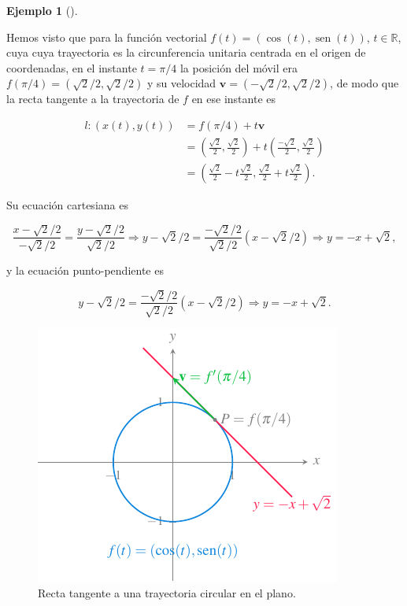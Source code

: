 \documentclass[
  a4paper,
]{scrreport}
\theoremstyle{definition}
\newtheorem{example}{Ejemplo}[chapter]
\theoremstyle{plain}
\theoremstyle{plain}
\theoremstyle{plain}
\theoremstyle{definition}
\theoremstyle{remark}
\begin{document}
\begin{example}[]\protect\hypertarget{exm-tangente-trayectoria-plano}{}\label{exm-tangente-trayectoria-plano}

Hemos visto que para la función vectorial
\(f(t) = (\cos(t),\operatorname{sen}(t))\), \(t\in \mathbb{R}\), cuya
cuya trayectoria es la circunferencia unitaria centrada en el origen de
coordenadas, en el instante \(t=\pi/4\) la posición del móvil era
\(f(\pi/4)=(\sqrt{2}/2,\sqrt{2}/2)\) y su velocidad
\(\mathbf{v}=(-\sqrt{2}/2,\sqrt{2}/2)\), de modo que la recta tangente a
la trayectoria de \(f\) en ese instante es

\begin{align*}
l: (x(t),y(t)) 
&= f(\pi/4)+t\mathbf{v} \\
&= \left(\frac{\sqrt{2}}{2},\frac{\sqrt{2}}{2}\right)+t\left(\frac{-\sqrt{2}}{2},\frac{\sqrt{2}}{2}\right) \\
&= \left(\frac{\sqrt{2}}{2}-t\frac{\sqrt{2}}{2},\frac{\sqrt{2}}{2}+t\frac{\sqrt{2}}{2}\right).
\end{align*}

Su ecuación cartesiana es

\[
\frac{x-\sqrt{2}/2}{-\sqrt{2}/2} = \frac{y-\sqrt{2}/2}{\sqrt{2}/2}\Rightarrow y-\sqrt{2}/2 =
\frac{-\sqrt{2}/2}{\sqrt{2}/2}(x-\sqrt{2}/2) \Rightarrow y=-x+\sqrt{2},
\]

y la ecuación punto-pendiente es

\[
y-\sqrt{2}/2 = \frac{-\sqrt{2}/2}{\sqrt{2}/2}(x-\sqrt{2}/2) \Rightarrow y=-x+\sqrt{2}.
\]

\begin{figure}

{\centering \includegraphics{img/derivadas-funciones-vectoriales/tangente-trayectoria-plano.pdf}

}

\caption{Recta tangente a una trayectoria circular en el plano.}

\end{figure}

\end{example}
\end{document}
